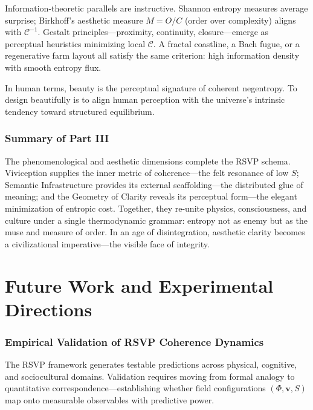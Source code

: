 \documentclass[12pt,a4paper]{article}
\begin{document}
Information-theoretic parallels are instructive. Shannon entropy measures average surprise; Birkhoff’s aesthetic measure $M = O/C$ (order over complexity) aligns with $\mathcal{C}^{-1}$. Gestalt principles—proximity, continuity, closure—emerge as perceptual heuristics minimizing local $\mathcal{C}$. A fractal coastline, a Bach fugue, or a regenerative farm layout all satisfy the same criterion: high information density with smooth entropy flux.

In human terms, beauty is the perceptual signature of coherent negentropy. To design beautifully is to align human perception with the universe’s intrinsic tendency toward structured equilibrium.

\section*{Summary of Part III}
The phenomenological and aesthetic dimensions complete the RSVP schema. Viviception supplies the inner metric of coherence—the felt resonance of low $S$; Semantic Infrastructure provides its external scaffolding—the distributed glue of meaning; and the Geometry of Clarity reveals its perceptual form—the elegant minimization of entropic cost. Together, they re-unite physics, consciousness, and culture under a single thermodynamic grammar: entropy not as enemy but as the muse and measure of order. In an age of disintegration, aesthetic clarity becomes a civilizational imperative—the visible face of integrity.

\clearpage
\part{Future Work and Experimental Directions}

\section{Empirical Validation of RSVP Coherence Dynamics}
The RSVP framework generates testable predictions across physical, cognitive, and sociocultural domains. Validation requires moving from formal analogy to quantitative correspondence—establishing whether field configurations $(\Phi, \bm{v}, S)$ map onto measurable observables with predictive power.
\end{document}
